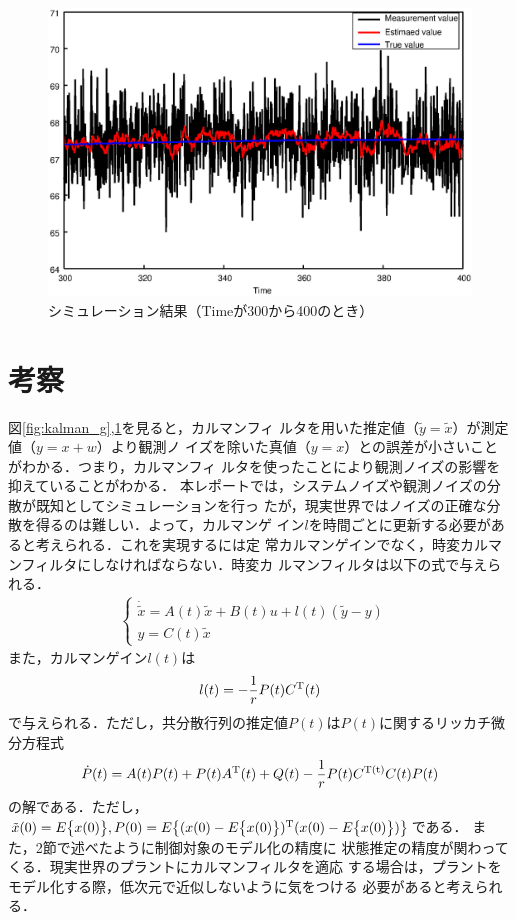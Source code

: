 \documentclass[a4paper,12pt]{jarticle}
\begin{document}
%
\begin{figure}[htbp]
 \begin{center}
  \includegraphics[width = 150mm]{fig/kalmanfilterB.eps}
 \end{center}
 \caption{シミュレーション結果（Timeが300から400のとき）}
 \label{fig:kalman_B}
\end{figure}
%
\newpage
%
\section{考察}
図\ref{fig:kalman_g},\ref{fig:kalman_B}を見ると，カルマンフィ
ルタを用いた推定値（$\tilde{y}=\tilde{x}$）が測定値（$y=x+w$）より観測ノ
イズを除いた真値（$y=x$）との誤差が小さいことがわかる．つまり，カルマンフィ
ルタを使ったことにより観測ノイズの影響を抑えていることがわかる．
%
本レポートでは，システムノイズや観測ノイズの分散が既知としてシミュレーションを行っ
たが，現実世界ではノイズの正確な分散を得るのは難しい．よって，カルマンゲ
イン$l$を時間ごとに更新する必要があると考えられる．これを実現するには定
常カルマンゲインでなく，時変カルマンフィルタにしなければならない．時変カ
ルマンフィルタは以下の式で与えられる．
\begin{eqnarray}
 \begin{cases}
  \dot{\tilde{x}}=A(t) \tilde{x} + B(t)u + l(t)(\tilde{y} - y) & \\
  y = C(t)\tilde{x}
 \end{cases}
\end{eqnarray}
また，カルマンゲイン$l(t)$は
\begin{equation}
 l(t) = - \frac{1}{r}P(t)C^{\rm{T}}(t)
\end{equation}
で与えられる．ただし，共分散行列の推定値$P(t)$は$P(t)$に関するリッカチ微
分方程式
\begin{equation}
 \dot{P}(t) = A(t)P(t)+P(t)A^{\rm{T}}(t)+Q(t)-\frac{1}{r}P(t)C^{\rm{T}(t)}C(t)P(t)
\end{equation}
の解である．ただし，$\tilde{x}(0)=E \bigl\{ x(0)
\bigr\},P(0)=E\bigl\{(x(0) - E \bigl\{ x(0) \bigr\})^{\rm{T}}(x(0) - E
\bigl\{ x(0)\bigr\})\bigr\}$である．
また，2節で述べたように制御対象のモデル化の精度に
状態推定の精度が関わってくる．現実世界のプラントにカルマンフィルタを適応
する場合は，プラントをモデル化する際，低次元で近似しないように気をつける
必要があると考えられる．
%
\end{document}

